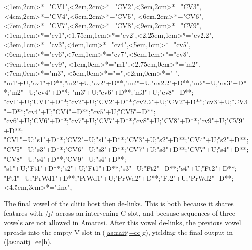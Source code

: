 \begin{multicols}{2}
\begin{exe}
{\begin{xlist}
{		<1em,2cm>*="CV1",<2em,2cm>*="CV2",<3em,2cm>*="CV3",<4em,2cm>*="CV4",<5em,2cm>*="CV5",
		<6em,2cm>*="CV6",<7em,2cm>*="CV7",<8em,2cm>*="CV8",<9em,2cm>*="CV9",
		<1em,1cm>*="cv1",<1.75em,1cm>*="cv2",<2.25em,1cm>*="cv2.2",<3em,1cm>*="cv3",<4em,1cm>*="cv4",<5em,1cm>*\as{\j}="cv5",
		<6em,1cm>*="cv6",<7em,1cm>*\as{ }="cv7",<8em,1cm>*="cv8",<9em,1cm>*\as{ }="cv9",
		<1em,0cm>*="m1",<2.75em,0cm>*="m2",<7em,0cm>*="m3",
		<5em,0cm>*\as{=}="=",<2em,0cm>*\as{-}="-",
		"m1"+U;"cv1"+D**\dir{-};"m2"+U;"cv2"+D**\dir{-};"m2"+U;"cv2.2"+D**\dir{-};"m2"+U;"cv3"+D**\dir{-};"m2"+U;"cv4"+D**\dir{-};
		"m3"+U;"cv6"+D**\dir{-};"m3"+U;"cv8"+D**\dir{-};
		"cv1"+U;"CV1"+D**\dir{-};"cv2"+U;"CV2"+D**\dir{-};"cv2.2"+U;"CV2"+D**\dir{-};"cv3"+U;"CV3"+D**\dir{-};"cv4"+U;"CV4"+D**\dir{-};"cv5"+U;"CV5"+D**\dir{-};
		"cv6"+U;"CV6"+D**\dir{-};"cv7"+U;"CV7"+D**\dir{};"cv8"+U;"CV8"+D**\dir{-};"cv9"+U;"CV9"+D**\dir{};
		"CV1"+U;"s1"+D**\dir{-};"CV2"+U;"s1"+D**\dir{-};"CV3"+U;"s2"+D**\dir{-};"CV4"+U;"s2"+D**\dir{-};
		"CV5"+U;"s3"+D**\dir{-};"CV6"+U;"s3"+D**\dir{-};"CV7"+U;"s3"+D**\dir{-};"CV7"+U;"s4"+D**\dir{-};"CV8"+U;"s4"+D**\dir{-};"CV9"+U;"s4"+D**\dir{-};
		"s1"+U;"Ft1"+D**\dir{-};"s2"+U;"Ft1"+D**\dir{-};"s3"+U;"Ft2"+D**\dir{-};"s4"+U;"Ft2"+D**\dir{-};
		"Ft1"+U;"PrWd1"+D**\dir{-};"PrWd1"+U;"PrWd2"+D**\dir{-};"Ft2"+U;"PrWd2"+D**\dir{-};
		<4.5em,3cm>*="line",
	\endxy}
	\end{xlist}}
\end{exe}
\end{multicols}

The final vowel of the clitic host then de-links.
This is both because it shares features with /\j/ across an intervening C-slot,
and because sequences of three vowels are not allowed in Amarasi.
After this vowel de-links, the previous vowel spreads into the empty V-slot in (\ref{as:naitj=ee}g),
yielding the final output in (\ref{as:naitj=ee}h).

